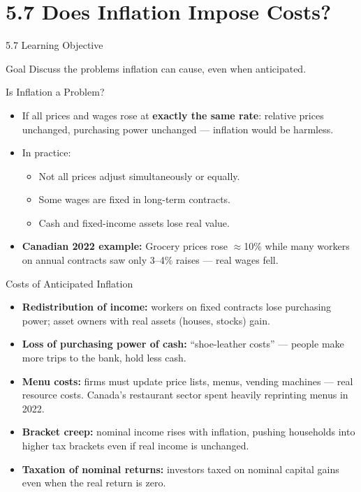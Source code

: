 \documentclass[aspectratio=169]{beamer}
\begin{document}
\section{5.7 Does Inflation Impose Costs?}

\begin{frame}{5.7 Learning Objective}
\transfade
\begin{block}{Goal}
Discuss the problems inflation can cause, even when anticipated.
\end{block}
\end{frame}

\begin{frame}{Is Inflation a Problem?}
\transfade
\begin{itemize}
  \item If all prices and wages rose at \textbf{exactly the same rate}: relative prices unchanged, purchasing power unchanged --- inflation would be harmless.
  \item In practice:
  \begin{itemize}
    \item Not all prices adjust simultaneously or equally.
    \item Some wages are fixed in long-term contracts.
    \item Cash and fixed-income assets lose real value.
  \end{itemize}
  \item \textbf{Canadian 2022 example:} Grocery prices rose $\approx$10\% while many workers on annual contracts saw only 3--4\% raises --- real wages fell.
\end{itemize}
\end{frame}

\begin{frame}{Costs of Anticipated Inflation}
\transfade
\begin{itemize}
  \item \textbf{Redistribution of income:} workers on fixed contracts lose purchasing power; asset owners with real assets (houses, stocks) gain.
  \item \textbf{Loss of purchasing power of cash:} ``shoe-leather costs'' --- people make more trips to the bank, hold less cash.
  \item \textbf{Menu costs:} firms must update price lists, menus, vending machines --- real resource costs. Canada's restaurant sector spent heavily reprinting menus in 2022.
  \item \textbf{Bracket creep:} nominal income rises with inflation, pushing households into higher tax brackets even if real income is unchanged.
  \item \textbf{Taxation of nominal returns:} investors taxed on nominal capital gains even when the real return is zero.
\end{itemize}
\end{frame}
\end{document}
